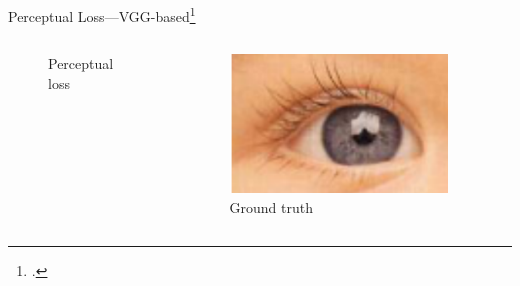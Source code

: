 \documentclass{beamer}
\begin{document}
\begin{frame}{Perceptual Loss---VGG-based\footcite{PerceptualLoss}}
\begin{columns}
\begin{column}{0.33\linewidth}
\begin{figure}[h]
      \caption*{Perceptual loss}
    \end{figure}
  \end{column}  \begin{column}{0.33\linewidth}
    \begin{figure}[h]
      \centering
        \includegraphics[width=0.9\textwidth]{perceptual_loss_gt}
      \caption*{Ground truth}
    \end{figure}
  \end{column}
\end{columns}
\end{frame}
\end{document}
